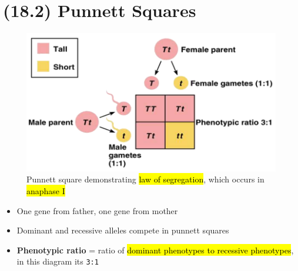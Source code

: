\documentclass[a4paper,12pt]{article}
\begin{document}
\section{(18.2) Punnett Squares}
\begin{figure}[H]
    \centering
    \includegraphics[width=\textwidth]{punnett}
    \caption{Punnett square demonstrating \hl{law of segregation}, which occurs in \hl{anaphase I}}
\end{figure}
\begin{itemize}
    \item{One gene from father, one gene from mother}
    \item{Dominant and recessive alleles compete in punnett squares}
    \item{\textbf{Phenotypic ratio} = ratio of \hl{dominant phenotypes to recessive phenotypes}, in this diagram its \texttt{3:1}}
\end{itemize}
\end{document}
